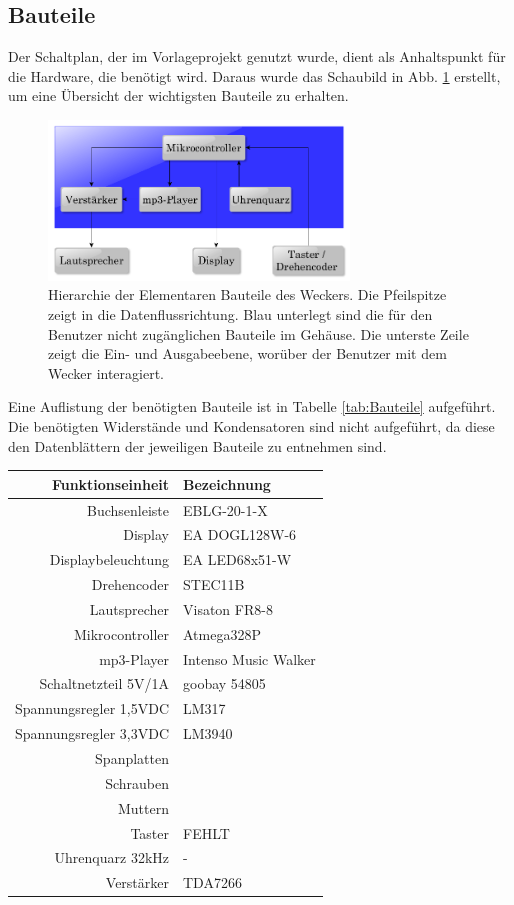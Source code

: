 \documentclass[journal, a4paper]{IEEEtran}
\begin{document}
	\subsection{Bauteile}
		\label{sc:Hardware:subsc:Bauteile}
		Der Schaltplan, der im Vorlageprojekt genutzt wurde, dient als Anhaltspunkt für die Hardware, die benötigt wird. Daraus wurde das Schaubild in Abb. \ref{fig:Hierarchie} erstellt, um eine Übersicht der wichtigsten Bauteile zu erhalten.
		\begin{figure}
				\includegraphics[width=80mm]{./Grafiken/Hierarchie}
				\caption{Hierarchie der Elementaren Bauteile des Weckers. Die Pfeilspitze zeigt in die Datenflussrichtung. Blau unterlegt sind die für den Benutzer nicht zugänglichen Bauteile im Gehäuse. Die unterste Zeile zeigt die Ein- und Ausgabeebene, worüber der Benutzer mit dem Wecker interagiert.}
				\label{fig:Hierarchie}
		\end{figure} 
		Eine Auflistung der benötigten Bauteile ist in Tabelle \ref{tab:Bauteile} aufgeführt. Die benötigten Widerstände und Kondensatoren sind nicht aufgeführt, da diese den Datenblättern der jeweiligen Bauteile zu entnehmen sind. 
		\begin{center}
			\begin{tabular}{rl}
				\toprule
				Funktionseinheit & Bezeichnung \\
				\midrule
				Buchsenleiste & EBLG-20-1-X\\
				Display & EA DOGL128W-6 \\
				Displaybeleuchtung & EA LED68x51-W\\
				Drehencoder & STEC11B \\
				Lautsprecher & Visaton FR8-8 \\
				Mikrocontroller & Atmega328P \\
				mp3-Player & Intenso Music Walker \\
				Schaltnetzteil 5V/1A & goobay 54805 \\
				Spannungsregler 1,5VDC & LM317\\
				Spannungsregler 3,3VDC & LM3940 \\
				Spanplatten & \\
				Schrauben &\\
				Muttern&\\
				Taster & FEHLT \\
				Uhrenquarz 32kHz& - \\			
				Verstärker & TDA7266 \\
				\bottomrule		
			\end{tabular}
			\label{tab:Bauteile}
		\end{center}
\end{document}
